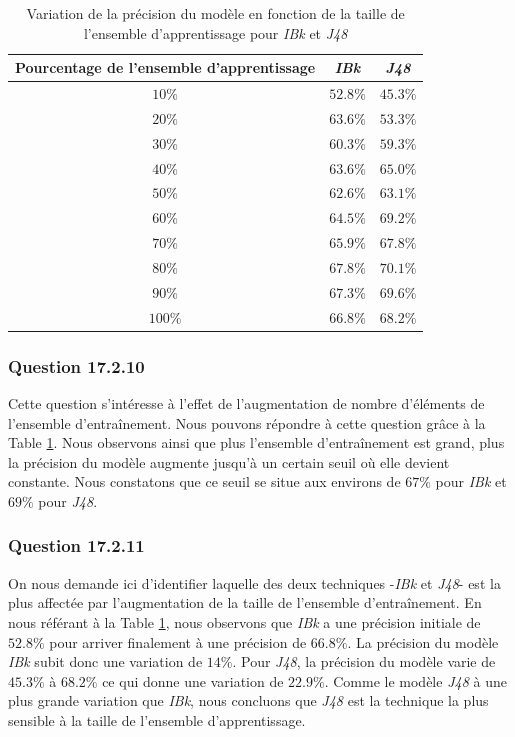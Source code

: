 \documentclass[10pt,a4paper]{article}
\begin{document}
				\begin{table}[h]
					\centering
					\caption{Variation de la précision du modèle en fonction de la taille de l'ensemble d'apprentissage pour \textit{IBk} et \textit{J48}}
					\label{tab-IBk-J48}
					\begin{tabular}{|c|c|c|}
						\hline
						Pourcentage de l'ensemble d'apprentissage & \textit{IBk} & \textit{J48}\\
						\hline
						$10\%$ & $52.8\%$ & $45.3\%$ \\
						\hline
						$20\%$ & $63.6\%$ & $53.3\%$ \\
						\hline
						$30\%$ & $60.3\%$ & $59.3\%$ \\
						\hline
						$40\%$ & $63.6\%$ & $65.0\%$ \\
						\hline
						$50\%$ & $62.6\%$ & $63.1\%$ \\
						\hline
						$60\%$ & $64.5\%$ & $69.2\%$ \\
						\hline
						$70\%$ & $65.9\%$ & $67.8\%$ \\
						\hline
						$80\%$ & $67.8\%$ & $70.1\%$ \\
						\hline
						$90\%$ & $67.3\%$ & $69.6\%$ \\
						\hline
						$100\%$ & $66.8\%$ & $68.2\%$ \\
						\hline
					\end{tabular}
				\end{table}
			
			\subsubsection*{Question 17.2.10}
		
			Cette question s'intéresse à l'effet de l'augmentation de nombre d'éléments de l'ensemble d'entraînement. Nous pouvons répondre à cette question grâce à la Table \ref{tab-IBk-J48}. Nous observons ainsi que plus l'ensemble d'entraînement est grand, plus la précision du modèle augmente jusqu'à un certain seuil où elle devient constante. Nous constatons que ce seuil se situe aux environs de $67\%$ pour \textit{IBk} et $69\%$ pour \textit{J48}.
		
			\subsubsection*{Question 17.2.11}
		
			On nous demande ici d'identifier laquelle des deux techniques -\textit{IBk} et \textit{J48}- est la plus affectée par l'augmentation de la taille de l'ensemble d'entraînement. En nous référant à la Table \ref{tab-IBk-J48}, nous observons que \textit{IBk} a une précision initiale de $52.8\%$ pour arriver finalement à une précision de $66.8\%$. La précision du modèle \textit{IBk} subit donc une variation de $14\%$. Pour \textit{J48}, la précision du modèle varie de $45.3\%$ à $68.2\%$ ce qui donne une variation de $22.9\%$. Comme le modèle \textit{J48} à une plus grande variation que \textit{IBk}, nous concluons que \textit{J48} est la technique la plus sensible à la taille de l'ensemble d'apprentissage.
			
\end{document}
